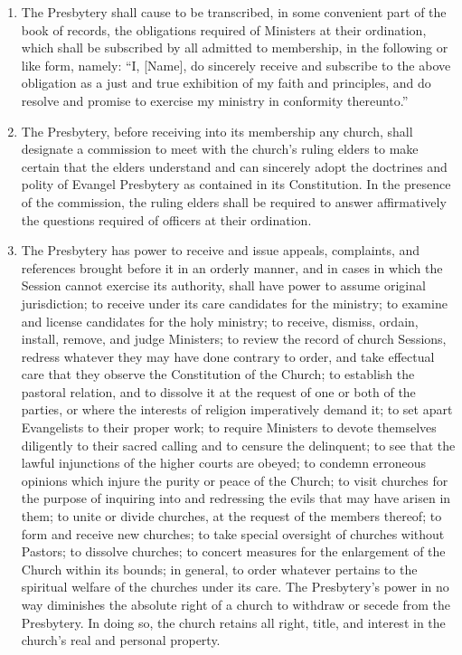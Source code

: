 \documentclass[
]{book}
\begin{document}
\begin{enumerate}
\item
  The Presbytery shall cause to be transcribed, in some convenient part of the book of records, the obligations required of Ministers at their ordination, which shall be subscribed by all admitted to membership, in the following or like form, namely: ``I, {[}Name{]}, do sincerely receive and subscribe to the above obligation as a just and true exhibition of my faith and principles, and do resolve and promise to exercise my ministry in conformity thereunto.''
\item
  \protect\hypertarget{15.7}{\href{}{}}The Presbytery, before receiving into its membership any church, shall designate a commission to meet with the church's ruling elders to make certain that the elders understand and can sincerely adopt the doctrines and polity of Evangel Presbytery as contained in its Constitution. In the presence of the commission, the ruling elders shall be required to answer affirmatively the questions required of officers at their ordination.
\item
  \protect\hypertarget{15.8}{\href{}{}}The Presbytery has power to receive and issue appeals, complaints, and references brought before it in an orderly manner, and in cases in which the Session cannot exercise its authority, shall have power to assume original jurisdiction; to receive under its care candidates for the ministry; to examine and license candidates for the holy ministry; to receive, dismiss, ordain, install, remove, and judge Ministers; to review the record of church Sessions, redress whatever they may have done contrary to order, and take effectual care that they observe the Constitution of the Church; to establish the pastoral relation, and to dissolve it at the request of one or both of the parties, or where the interests of religion imperatively demand it; to set apart Evangelists to their proper work; to require Ministers to devote themselves diligently to their sacred calling and to censure the delinquent; to see that the lawful injunctions of the higher courts are obeyed; to condemn erroneous opinions which injure the purity or peace of the Church; to visit churches for the purpose of inquiring into and redressing the evils that may have arisen in them; to unite or divide churches, at the request of the members thereof; to form and receive new churches; to take special oversight of churches without Pastors; to dissolve churches; to concert measures for the enlargement of the Church within its bounds; in general, to order whatever pertains to the spiritual welfare of the churches under its care. The Presbytery's power in no way diminishes the absolute right of a church to withdraw or secede from the Presbytery. In doing so, the church retains all right, title, and interest in the church's real and personal property.

\end{enumerate}
\end{document}
